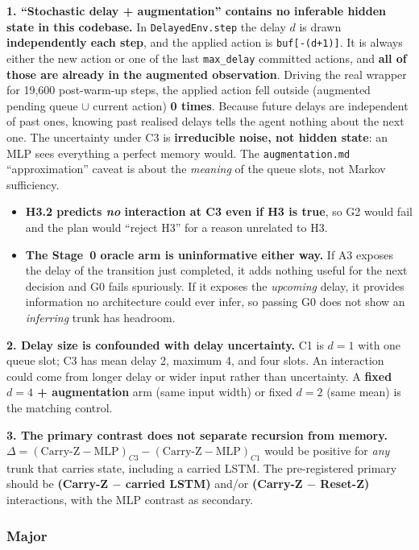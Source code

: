 \documentclass[11pt]{article}
\begin{document}
\textbf{1. ``Stochastic delay + augmentation'' contains no inferable hidden state in this codebase.} In \texttt{DelayedEnv.step} the delay $d$ is drawn \textbf{independently each step}, and the applied action is \texttt{buf[-(d+1)]}. It is always either the new action or one of the last \texttt{max\_delay} committed actions, and \textbf{all of those are already in the augmented observation}. Driving the real wrapper for 19{,}600 post-warm-up steps, the applied action fell outside (augmented pending queue $\cup$ current action) \textbf{0 times}. Because future delays are independent of past ones, knowing past realised delays tells the agent nothing about the next one. The uncertainty under C3 is \textbf{irreducible noise, not hidden state}: an MLP sees everything a perfect memory would. The \texttt{augmentation.md} ``approximation'' caveat is about the \emph{meaning} of the queue slots, not Markov sufficiency.
\begin{itemize}
  \item \textbf{H3.2 predicts \emph{no} interaction at C3 even if H3 is true}, so G2 would fail and the plan would ``reject H3'' for a reason unrelated to H3.
  \item \textbf{The Stage~0 oracle arm is uninformative either way.} If A3 exposes the delay of the transition just completed, it adds nothing useful for the next decision and G0 fails spuriously. If it exposes the \emph{upcoming} delay, it provides information no architecture could ever infer, so passing G0 does not show an \emph{inferring} trunk has headroom.
\end{itemize}

\textbf{2. Delay size is confounded with delay uncertainty.} C1 is $d=1$ with one queue slot; C3 has mean delay 2, maximum 4, and four slots. An interaction could come from longer delay or wider input rather than uncertainty. A \textbf{fixed $d=4$ + augmentation} arm (same input width) or fixed $d=2$ (same mean) is the matching control.

\textbf{3. The primary contrast does not separate recursion from memory.} $\Delta = (\text{Carry-Z}-\text{MLP})_{C3} - (\text{Carry-Z}-\text{MLP})_{C1}$ would be positive for \emph{any} trunk that carries state, including a carried LSTM. The pre-registered primary should be \textbf{(Carry-Z $-$ carried LSTM)} and/or \textbf{(Carry-Z $-$ Reset-Z)} interactions, with the MLP contrast as secondary.

\subsubsection*{Major}
\end{document}
